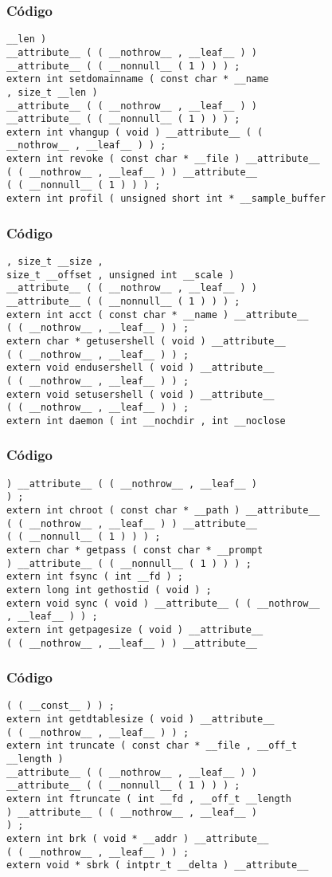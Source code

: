 \documentclass{beamer}
\begin{document}
\begin{frame}[fragile]
\frametitle{C\'odigo}
\begin{verbatim}
__len ) 
__attribute__ ( ( __nothrow__ , __leaf__ ) ) 
__attribute__ ( ( __nonnull__ ( 1 ) ) ) ; 
extern int setdomainname ( const char * __name 
, size_t __len ) 
__attribute__ ( ( __nothrow__ , __leaf__ ) ) 
__attribute__ ( ( __nonnull__ ( 1 ) ) ) ; 
extern int vhangup ( void ) __attribute__ ( ( 
__nothrow__ , __leaf__ ) ) ; 
extern int revoke ( const char * __file ) __attribute__ 
( ( __nothrow__ , __leaf__ ) ) __attribute__ 
( ( __nonnull__ ( 1 ) ) ) ; 
extern int profil ( unsigned short int * __sample_buffer 
\end{verbatim}
\end{frame}
\begin{frame}[fragile]
\frametitle{C\'odigo}
\begin{verbatim}
, size_t __size , 
size_t __offset , unsigned int __scale ) 
__attribute__ ( ( __nothrow__ , __leaf__ ) ) 
__attribute__ ( ( __nonnull__ ( 1 ) ) ) ; 
extern int acct ( const char * __name ) __attribute__ 
( ( __nothrow__ , __leaf__ ) ) ; 
extern char * getusershell ( void ) __attribute__ 
( ( __nothrow__ , __leaf__ ) ) ; 
extern void endusershell ( void ) __attribute__ 
( ( __nothrow__ , __leaf__ ) ) ; 
extern void setusershell ( void ) __attribute__ 
( ( __nothrow__ , __leaf__ ) ) ; 
extern int daemon ( int __nochdir , int __noclose 
\end{verbatim}
\end{frame}
\begin{frame}[fragile]
\frametitle{C\'odigo}
\begin{verbatim}
) __attribute__ ( ( __nothrow__ , __leaf__ ) 
) ; 
extern int chroot ( const char * __path ) __attribute__ 
( ( __nothrow__ , __leaf__ ) ) __attribute__ 
( ( __nonnull__ ( 1 ) ) ) ; 
extern char * getpass ( const char * __prompt 
) __attribute__ ( ( __nonnull__ ( 1 ) ) ) ; 
extern int fsync ( int __fd ) ; 
extern long int gethostid ( void ) ; 
extern void sync ( void ) __attribute__ ( ( __nothrow__ 
, __leaf__ ) ) ; 
extern int getpagesize ( void ) __attribute__ 
( ( __nothrow__ , __leaf__ ) ) __attribute__ 
\end{verbatim}
\end{frame}
\begin{frame}[fragile]
\frametitle{C\'odigo}
\begin{verbatim}
( ( __const__ ) ) ; 
extern int getdtablesize ( void ) __attribute__ 
( ( __nothrow__ , __leaf__ ) ) ; 
extern int truncate ( const char * __file , __off_t 
__length ) 
__attribute__ ( ( __nothrow__ , __leaf__ ) ) 
__attribute__ ( ( __nonnull__ ( 1 ) ) ) ; 
extern int ftruncate ( int __fd , __off_t __length 
) __attribute__ ( ( __nothrow__ , __leaf__ ) 
) ; 
extern int brk ( void * __addr ) __attribute__ 
( ( __nothrow__ , __leaf__ ) ) ; 
extern void * sbrk ( intptr_t __delta ) __attribute__ 
\end{verbatim}
\end{frame}
\end{document}
